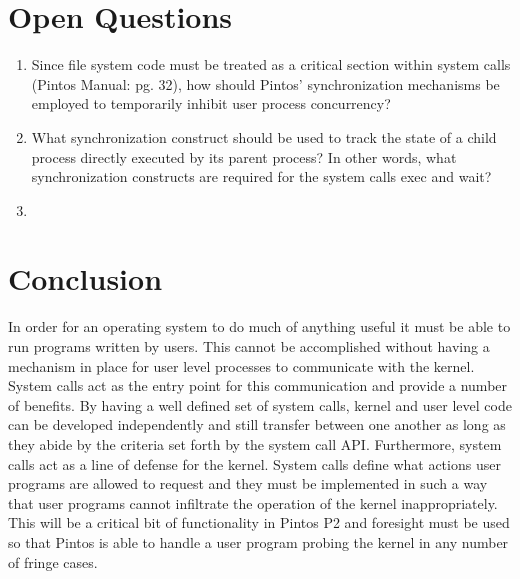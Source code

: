 \documentclass[11pt, letterpaper]{article}
\begin{document}
\section*{Open Questions}

\begin{enumerate}
\item Since file system code must be treated as a critical section within system calls (Pintos Manual: pg. 32), how should Pintos' synchronization mechanisms be employed to temporarily inhibit user process concurrency?
\item What synchronization construct should be used to track the state of a child process directly executed by its parent process? In other words, what synchronization constructs are required for the system calls exec and wait?
\item 
\end{enumerate}



\section*{Conclusion}

In order for an operating system to do much of anything useful it must be able to run programs written by users. This cannot be 
accomplished without having a mechanism in place for user level processes to communicate with the kernel. System calls act as the 
entry point for this communication and provide a number of benefits. By having a well defined set of system calls, kernel and user 
level code can be developed independently and still transfer between one another as long as they abide by the criteria set forth by 
the system call API. Furthermore, system calls act as a line of defense for the kernel. System calls define what actions user 
programs are allowed to request and they must be implemented in such a way that user programs cannot infiltrate the operation of the
kernel inappropriately. This will be a critical bit of functionality in Pintos P2 and foresight must be used so that Pintos is able
to handle a user program probing the kernel in any number of fringe cases.
\end{document}
